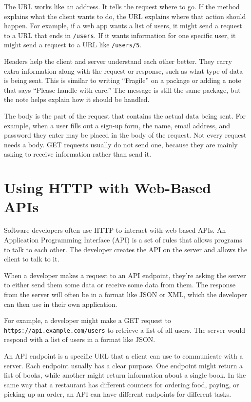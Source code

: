 The URL works like an address. It tells the request where to go. If
the method explains what the client wants to do, the URL explains
where that action should happen. For example, if a web app wants a
list of users, it might send a request to a URL that ends in
\verb|/users|. If it wants information for one specific user, it might
send a request to a URL like \verb|/users/5|.

Headers help the client and server understand each other better. They
carry extra information along with the request or response, such as
what type of data is being sent. This is similar to writing
``Fragile'' on a package or adding a note that says ``Please handle
with care.'' The message is still the same package, but the note helps
explain how it should be handled.

The body is the part of the request that contains the actual data
being sent. For example, when a user fills out a sign-up form, the
name, email address, and password they enter may be placed in the body
of the request. Not every request needs a body. GET requests usually
do not send one, because they are mainly asking to receive information
rather than send it.


\section{Using HTTP with Web-Based APIs}


Software developers often use HTTP to interact with web-based APIs. An
Application Programming Interface (API) is a set of rules that allows
programs to talk to each other. The developer creates the API on the
server and allows the client to talk to it.

When a developer makes a request to an API endpoint, they're asking
the server to either send them some data or receive some data from
them. The response from the server will often be in a format like JSON
or XML, which the developer can then use in their own application.

For example, a developer might make a GET request to
\texttt{https://api.example.com/users} to retrieve a list of all
users. The server would respond with a list of users in a format like
JSON.

An API endpoint is a specific URL that a client can use to communicate
with a server. Each endpoint usually has a clear purpose. One endpoint
might return a list of books, while another might return information
about a single book. In the same way that a restaurant has different
counters for ordering food, paying, or picking up an order, an API can
have different endpoints for different tasks.

